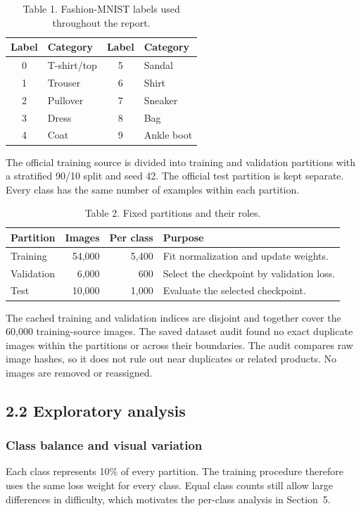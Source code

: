 \begin{table}[H]\centering
\caption{Table 1. Fashion-MNIST labels used throughout the report.}\label{tab:labels}
\begin{tabular}{clcl}\toprule
Label & Category & Label & Category\\\midrule
0 & T-shirt/top & 5 & Sandal\\
1 & Trouser & 6 & Shirt\\
2 & Pullover & 7 & Sneaker\\
3 & Dress & 8 & Bag\\
4 & Coat & 9 & Ankle boot\\\bottomrule
\end{tabular}
\end{table}

The official training source is divided into training and validation partitions
with a stratified 90/10 split and seed 42. The official test partition is kept
separate. Every class has the same number of examples within each partition.

\begin{table}[H]\centering
\caption{Table 2. Fixed partitions and their roles.}\label{tab:splits}
\begin{tabularx}{\linewidth}{lrrX}\toprule
Partition & Images & Per class & Purpose\\\midrule
Training & 54,000 & 5,400 & Fit normalization and update weights.\\
Validation & 6,000 & 600 & Select the checkpoint by validation loss.\\
Test & 10,000 & 1,000 & Evaluate the selected checkpoint.\\\bottomrule
\end{tabularx}
\end{table}

The cached training and validation indices are disjoint and together cover the
60,000 training-source images. The saved dataset audit found no exact duplicate
images within the partitions or across their boundaries. The audit compares raw
image hashes, so it does not rule out near duplicates or related products.
No images are removed or reassigned.

\subsection{2.2 Exploratory analysis}
\subsubsection{Class balance and visual variation}
Each class represents 10\% of every partition. The training procedure therefore
uses the same loss weight for every class. Equal class counts still allow large
differences in difficulty, which motivates the per-class analysis in Section~5.

